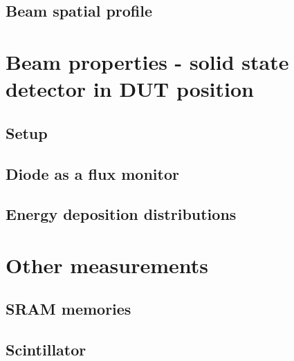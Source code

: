 \documentclass{cernatsnote}
\begin{document}
\subsection{Beam spatial profile} %


\section{Beam properties - solid state detector in DUT position}

\subsection{Setup} %


\subsection{Diode as a flux monitor} %


\subsection{Energy deposition distributions} %


\section{Other measurements}
\subsection{SRAM memories} %


\subsection{Scintillator} %




\end{document}
